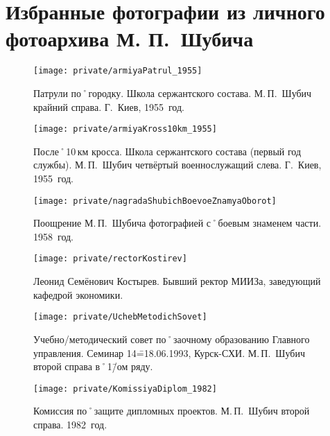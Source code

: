 ﻿\section{Избранные фотографии из личного фотоархива М. П.~Шубича}

\begin{figure}[h]
\texttt{[image: private/armiyaPatrul\_1955]}
\caption{Патрули по˚городку. Школа сержантского состава. М.\,П.~Шубич крайний справа. Г.~Киев, 1955~год.}
\label{fig:armiyaPatrul_1955}
\end{figure}

\begin{figure}[h]
\texttt{[image: private/armiyaKross10km\_1955]}
\caption{После˚10\,км кросса. Школа сержантского состава (первый год службы). М.\,П.~Шубич четвёртый военнослужащий слева. Г.~Киев, 1955~год.}
\label{fig:armiyaKross10km_1955}
\end{figure}


\begin{figure}[h]
\texttt{[image: private/nagradaShubichBoevoeZnamyaOborot]}
\caption{Поощрение М.\,П.~Шубича фотографией с˚боевым знаменем части. 1958~год.}
\label{fig:nagradaShubichBoevoeZnamyaOborot}
\end{figure}

\begin{figure}[h]
\texttt{[image: private/rectorKostirev]}
\caption{Леонид Семёнович Костырев. Бывший ректор МИИЗа, заведующий кафедрой экономики.}
\label{fig:rectorKostirev}
\end{figure}


\begin{figure}[h]
\texttt{[image: private/UchebMetodichSovet]}
\caption{Учебно\-/методический совет по˚заочному образованию Главного управления. Семинар 14\==18.06.1993, Курск-СХИ. М.\,П.~Шубич второй справа в˚1\=/ом ряду.}
\label{fig:UchebMetodichSovet}
\end{figure}

\begin{figure}[h]
\texttt{[image: private/KomissiyaDiplom\_1982]}
\caption{Комиссия по˚защите дипломных проектов. М.\,П.~Шубич второй справа. 1982~год.}
\label{fig:KomissiyaDiplom_1982}
\end{figure}

